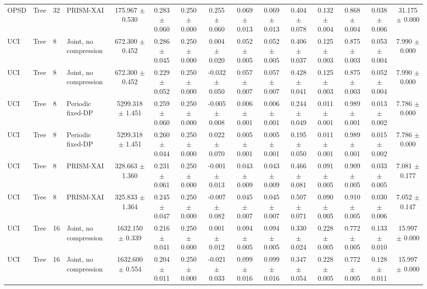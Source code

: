 \begin{tabular}{llllccccccccccc}
OPSD & Tree & 32 & PRISM-XAI & 175.967 $\pm$ 0.530 & 0.283 $\pm$ 0.060 & 0.250 $\pm$ 0.000 & 0.255 $\pm$ 0.060 & 0.069 $\pm$ 0.013 & 0.069 $\pm$ 0.013 & 0.404 $\pm$ 0.078 & 0.132 $\pm$ 0.004 & 0.868 $\pm$ 0.004 & 0.038 $\pm$ 0.006 & 31.175 $\pm$ 0.000 \\
UCI & Tree & 8 & Joint, no compression & 672.300 $\pm$ 0.452 & 0.286 $\pm$ 0.045 & 0.250 $\pm$ 0.000 & 0.004 $\pm$ 0.020 & 0.052 $\pm$ 0.005 & 0.052 $\pm$ 0.005 & 0.406 $\pm$ 0.037 & 0.125 $\pm$ 0.003 & 0.875 $\pm$ 0.003 & 0.053 $\pm$ 0.004 & 7.990 $\pm$ 0.000 \\
UCI & Tree & 8 & Joint, no compression & 672.300 $\pm$ 0.452 & 0.229 $\pm$ 0.052 & 0.250 $\pm$ 0.000 & -0.032 $\pm$ 0.050 & 0.057 $\pm$ 0.007 & 0.057 $\pm$ 0.007 & 0.428 $\pm$ 0.041 & 0.125 $\pm$ 0.003 & 0.875 $\pm$ 0.003 & 0.052 $\pm$ 0.004 & 7.990 $\pm$ 0.000 \\
UCI & Tree & 8 & Periodic fixed-DP & 5299.318 $\pm$ 1.451 & 0.259 $\pm$ 0.060 & 0.250 $\pm$ 0.000 & -0.005 $\pm$ 0.008 & 0.006 $\pm$ 0.001 & 0.006 $\pm$ 0.001 & 0.244 $\pm$ 0.049 & 0.011 $\pm$ 0.001 & 0.989 $\pm$ 0.001 & 0.013 $\pm$ 0.002 & 7.786 $\pm$ 0.000 \\
UCI & Tree & 8 & Periodic fixed-DP & 5299.318 $\pm$ 1.451 & 0.260 $\pm$ 0.044 & 0.250 $\pm$ 0.000 & 0.022 $\pm$ 0.070 & 0.005 $\pm$ 0.001 & 0.005 $\pm$ 0.001 & 0.195 $\pm$ 0.050 & 0.011 $\pm$ 0.001 & 0.989 $\pm$ 0.001 & 0.015 $\pm$ 0.002 & 7.786 $\pm$ 0.000 \\
UCI & Tree & 8 & PRISM-XAI & 328.663 $\pm$ 1.360 & 0.231 $\pm$ 0.061 & 0.250 $\pm$ 0.000 & -0.001 $\pm$ 0.013 & 0.043 $\pm$ 0.009 & 0.043 $\pm$ 0.009 & 0.466 $\pm$ 0.081 & 0.091 $\pm$ 0.005 & 0.909 $\pm$ 0.005 & 0.033 $\pm$ 0.005 & 7.081 $\pm$ 0.177 \\
UCI & Tree & 8 & PRISM-XAI & 325.833 $\pm$ 1.364 & 0.245 $\pm$ 0.047 & 0.250 $\pm$ 0.000 & -0.007 $\pm$ 0.082 & 0.045 $\pm$ 0.007 & 0.045 $\pm$ 0.007 & 0.507 $\pm$ 0.071 & 0.090 $\pm$ 0.005 & 0.910 $\pm$ 0.005 & 0.030 $\pm$ 0.006 & 7.052 $\pm$ 0.147 \\
UCI & Tree & 16 & Joint, no compression & 1632.150 $\pm$ 0.339 & 0.216 $\pm$ 0.041 & 0.250 $\pm$ 0.000 & 0.001 $\pm$ 0.012 & 0.094 $\pm$ 0.005 & 0.094 $\pm$ 0.005 & 0.330 $\pm$ 0.024 & 0.228 $\pm$ 0.005 & 0.772 $\pm$ 0.005 & 0.133 $\pm$ 0.010 & 15.997 $\pm$ 0.000 \\
UCI & Tree & 16 & Joint, no compression & 1632.600 $\pm$ 0.554 & 0.204 $\pm$ 0.011 & 0.250 $\pm$ 0.000 & -0.021 $\pm$ 0.033 & 0.099 $\pm$ 0.016 & 0.099 $\pm$ 0.016 & 0.347 $\pm$ 0.054 & 0.228 $\pm$ 0.005 & 0.772 $\pm$ 0.005 & 0.128 $\pm$ 0.011 & 15.997 $\pm$ 0.000 \\

\end{tabular}
